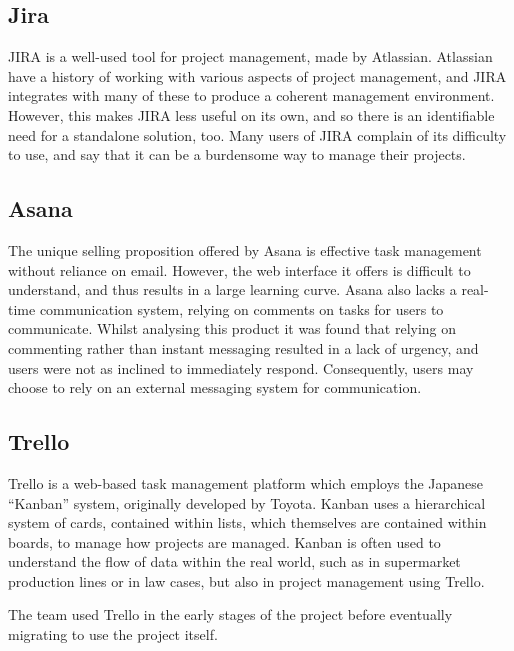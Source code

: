 \documentclass[a4paper]{l3proj}
\begin{document}
\subsection{Jira}
\label{jira}
JIRA is a well-used tool for project management, made by Atlassian. Atlassian have a history of working with various aspects of project management, and JIRA integrates with many of these to produce a coherent management environment. However, this makes JIRA less useful on its own, and so there is an identifiable need for a standalone solution, too. Many users of JIRA complain of its difficulty to use, and say that it can be a burdensome way to manage their projects.


\subsection{Asana}
\label{asana}

The unique selling proposition offered by Asana is effective task management without reliance on email. However, the web interface it offers is difficult to understand, and thus results in a large learning curve. Asana also lacks a real-time communication system, relying on comments on tasks for users to communicate. Whilst analysing this product it was found that relying on commenting rather than instant messaging resulted in a lack of urgency, and users were not as inclined to immediately respond. Consequently, users may choose to rely on an external messaging system for communication.

\subsection{Trello}
\label{trello}

Trello is a web-based task management platform which employs the Japanese ``Kanban''
system, originally developed by Toyota. Kanban uses a hierarchical system of
cards, contained within lists, which themselves are contained within boards, to
manage how projects are managed. Kanban is often used to understand the flow of data within the real world, such as in supermarket production lines or in law cases, but also in project management using Trello.

The team used Trello in the early stages of the project before eventually migrating to use the project itself.
\end{document}
